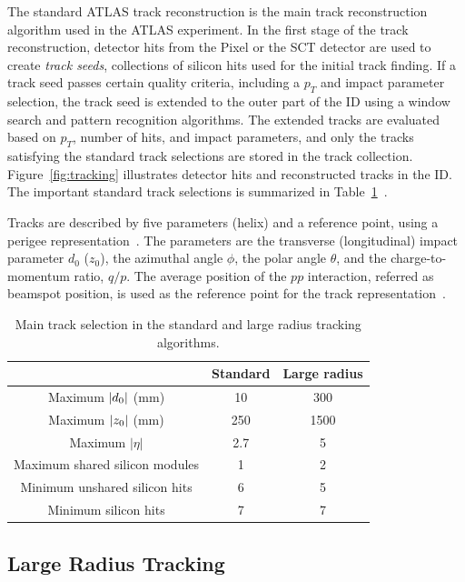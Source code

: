 The standard ATLAS track reconstruction is the main track reconstruction algorithm used in the ATLAS experiment. In the first stage of the track reconstruction, detector hits from the Pixel or the SCT detector are used to create \textit{track seeds}, collections of silicon hits used for the initial track finding. If a track seed passes certain quality criteria, including a $p_{T}$ and impact parameter selection, the track seed is extended to the outer part of the ID using a window search and pattern recognition algorithms. The extended tracks are evaluated based on $p_{T}$, number of hits, and impact parameters, and only the tracks satisfying the standard track selections are stored in the track collection. Figure~\ref{fig:tracking} illustrates detector hits and reconstructed tracks in the ID. The important standard track selections is summarized in Table~\ref{table:tracking}~\cite{ATL-PHYS-PUB-2017-014}.


Tracks are described by five parameters (helix) and a reference point, using a perigee representation~\cite{Akesson:973401}. The parameters are the transverse (longitudinal) impact parameter $d_{0}$ ($z_{0}$), the azimuthal angle $\phi$, the polar angle $\theta$, and the charge-to-momentum ratio, $q/p$. The average position of the $pp$ interaction, referred as beamspot position, is used as the reference point for the track representation~\cite{Aaboud:2016rmg}.


\begin{table}[!htb]
  \centering
  \begin{tabular}{ c  c  c }
    \hline
    \hline
    & Standard & Large radius \\ [0.5ex]
    \hline
    Maximum $|d_{\rm{0}}|$ (mm) & 10 & 300 \\
    Maximum $|z_{\rm{0}}|$ (mm) & 250 & 1500 \\
    Maximum $|\eta|$ & 2.7 & 5 \\
    Maximum shared silicon modules & 1 & 2 \\
    Minimum unshared silicon hits& 6 & 5 \\
    Minimum silicon hits & 7 & 7\\
    \hline
    \hline
  \end{tabular}
  \caption{Main track selection in the standard and large radius tracking algorithms.}
  \label{table:tracking}
\end{table}


\subsection{Large Radius Tracking}
\label{sec:reco:lrt}


